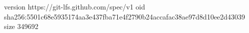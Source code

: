 version https://git-lfs.github.com/spec/v1
oid sha256:5501c68e5935174aa3e437fba71e4f2790b24accafac38ae97d8d10ee2d43039
size 349692

